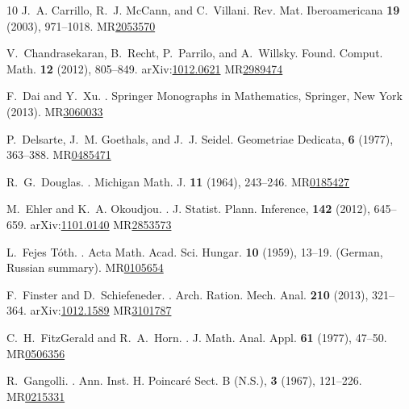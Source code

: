 \documentclass[11pt, leqno]{amsart}
\def\arXiv#1{arXiv:\href{http://arXiv.org/abs/#1}{#1}}
\def\MR#1{MR\href{http://www.ams.org/mathscinet-getitem?mr=#1}{#1}}
\theoremstyle{definition}
\numberwithin{equation}{section}
\begin{document}
\begin{thebibliography}{10}
J.~A. Carrillo, R.~J. McCann, and C.~Villani.
\newblock Rev. Mat. Iberoamericana {\bf 19} (2003), 971--1018. 
\MR{2053570}

V.~Chandrasekaran, B.~Recht, P.~Parrilo, and A.~Willsky.
\newblock  Found. Comput. Math. {\bf 12} (2012), 805--849. 
\arXiv{1012.0621}
\MR{2989474}


F.~Dai and Y.~Xu.
.
\newblock Springer Monographs in Mathematics, Springer, New York (2013).
\MR{3060033}


P.~Delsarte, J.~M. Goethals, and J.~J. Seidel.
\newblock Geometriae Dedicata, {\bf 6} (1977), 363--388.
\MR{0485471}

R.~G.~Douglas.
.
\newblock Michigan Math. J. {\bf 11} (1964), 243--246.
\MR{0185427}


M.~Ehler and K.~A. Okoudjou.
.
\newblock  J. Statist. Plann. Inference, {\bf 142} (2012), 645--659.
\arXiv{1101.0140}
\MR{2853573}

L.~Fejes T\'{o}th.
.  
Acta Math. Acad. Sci. Hungar. {\bf 10} (1959), 13--19. (German, Russian summary).
\MR{0105654}


F.~Finster and D.~Schiefeneder.
.
\newblock Arch. Ration. Mech. Anal. {\bf 210} (2013), 321--364.
\arXiv{1012.1589}
\MR{3101787}

C.~H.~FitzGerald and R.~A.~Horn.
.
\newblock J. Math. Anal. Appl. {\bf 61} (1977), 47--50.
\MR{0506356}


R.~Gangolli.
.
\newblock Ann. Inst. H. Poincar\'{e} Sect. B (N.S.), {\bf 3} (1967), 121--226.
\MR{0215331}


\end{thebibliography}
\end{document}
